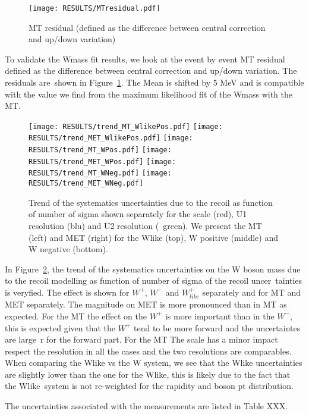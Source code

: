 \begin{figure}[h!]
  \begin{center}
    \texttt{[image: RESULTS/MTresidual.pdf]}
    \caption{
     MT residual (defined as the difference between central correction and up/down variation)
    }
    \label{fig:mtResidual}
  \end{center}
\end{figure}

To validate the Wmass fit results, we look at the event by event MT residual defined as the difference between central correction and up/down variation. The residuals are\
 shown in Figure~\ref{fig:mtResidual}.
The Mean is shifted by 5 MeV and is compatible with the value we find from the maximum likelihood fit of the Wmass with the MT.

\begin{figure}[h!]
  \begin{center}
    \texttt{[image: RESULTS/trend\_MT\_WlikePos.pdf]}
    \texttt{[image: RESULTS/trend\_MET\_WlikePos.pdf]}
    \texttt{[image: RESULTS/trend\_MT\_WPos.pdf]}
    \texttt{[image: RESULTS/trend\_MET\_WPos.pdf]}
    \texttt{[image: RESULTS/trend\_MT\_WNeg.pdf]}
    \texttt{[image: RESULTS/trend\_MET\_WNeg.pdf]}
    \caption{
     Trend of the systematics uncertainties due to the recoil as function of number of sigma shown separately for the scale (red), U1 resolution (blu) and U2 resolution (\
green).
     We present the MT (left) and MET (right) for the Wlike (top), W positive (middle) and W negative (bottom).
    }
    \label{fig:uncScan}
  \end{center}
\end{figure}

In Figure~\ref{fig:uncScan}, the trend of the systematics uncertainties on the W boson mass due to the recoil modelling as function of number of sigma of the recoil uncer\
tainties is veryfied.
The effect is shown for $W^{+}$, $W^{-}$ and $W_{like}^{+}$ separately and for MT and MET separately.
The magnitude on MET is more pronounced than in MT as expected.
For the MT the effect on the $W^{+}$ is more important than in the $W^{-}$, this is expected given that the $W^{+}$ tend to be more forward and the uncertaintes are large\
r for the forward part.
For the MT The scale has a minor impact respect the resolution in all the cases and the two resolutions are comparables.
When comparing the Wlike vs the W system, we see that the Wlike uncertainties are slightly lower than the one for the Wlike, this is likely due to the fact that the Wlike\
 system is not re-weighted for the rapidity and boson pt distribution.

The uncertainties associated with the measurements are listed in Table XXX.
